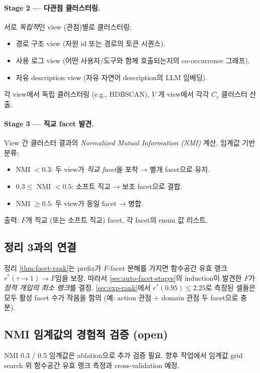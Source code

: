 \documentclass[11pt]{article}
\theoremstyle{definition}
\begin{document}
\paragraph{Stage 2 — 다관점 클러스터링.}
서로 \emph{독립적}인 view (관점)별로 클러스터링:
\begin{itemize}[leftmargin=*]
\item 경로 구조 view (자원 id 또는 경로의 토큰 시퀀스).
\item 사용 로그 view (어떤 사용자/도구와 함께 호출되는지의 co-occurrence 그래프).
\item 자유 description view (자유 자연어 description의 LLM 임베딩).
\end{itemize}
각 view에서 독립 클러스터링 (e.g., HDBSCAN), $V$ 개 view에서 각각 $C_v$ 클러스터 산출.

\paragraph{Stage 3 — 직교 facet 발견.}
View 간 클러스터 결과의 \emph{Normalized Mutual Information (NMI)} 계산. 임계값 기반 분류:
\begin{itemize}[leftmargin=*]
\item NMI $< 0.3$: 두 view가 \emph{직교 facet}을 포착 → 별개 facet으로 유지.
\item $0.3 \le$ NMI $< 0.5$: 소프트 직교 → 보조 facet으로 결합.
\item NMI $\ge 0.5$: 두 view가 동일 facet → 병합.
\end{itemize}
출력: $F$개 직교 (또는 소프트 직교) facet, 각 facet의 enum 값 리스트.

\subsection{정리 3과의 연결}

정리 \ref{thm:facet-rank}는 prefix가 $F$-facet 분해를 가지면 함수공간 유효 랭크 $r^*(\tau \to 1) \to F$임을 보장. 따라서 \cref{sec:auto-facet-stages}의 induction이 발견한 $F$가 \emph{정적 개입의 최소 랭크}를 결정. \cref{sec:exp-rank}에서 $r^*(0.95) \le 2.25$로 측정된 셀들은 모두 활성 facet 수가 작음을 함의 (예: action 관점 + domain 관점 두 facet으로 충분).

\subsection{NMI 임계값의 경험적 검증 (open)}
\label{sec:auto-facet-open}

NMI 0.3 / 0.5 임계값은 ablation으로 추가 검증 필요. 향후 작업에서 임계값 grid search 위 함수공간 유효 랭크 측정과 cross-validation 예정.
\end{document}
